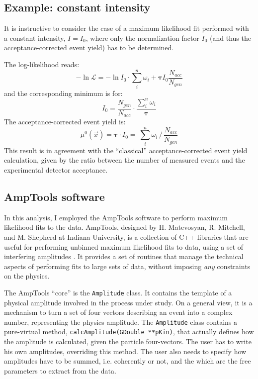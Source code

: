 \documentclass[a4paper,10pt]{report}
\begin{document}
\subsection{Example: constant intensity}

It is instructive to consider the case of a maximum likelihood fit performed with a constant intensity, $I=I_0$, where only the normalization factor $I_0$ (and thus the acceptance-corrected event yield) has to be determined.

The log-likelihood reads:
\begin{equation}
-\ln{\mathcal L} =- \ln{I_0} \cdot \sum_i^n \omega_i + \boldsymbol{\tau} I_0\frac{N_{acc}}{N_{gen}}
\end{equation}
and the corresponding minimum is for:
\begin{equation}
I_0 = \frac{N_{gen}}{N_{acc}} \cdot \frac{\sum_i^n \omega_i}{\boldsymbol{\tau}}
\end{equation} 
The acceptance-corrected event yield is:
\begin{equation}
\mu^0(\vec{x}) = \boldsymbol{\tau} \cdot I_0 = \ \sum_i^n \omega_i  \, / \, \frac{N_{acc}}{N_{gen}}
\end{equation} 
This result is in agreement with the ``classical'' acceptance-corrected event yield calculation, given by the ratio between the number of measured events and the experimental detector acceptance.

\subsection{AmpTools software}
In this analysis, I employed the AmpTools software to perform maximum likelihood fits to the data.
AmpTools, designed by H. Matevosyan, R. Mitchell, and M. Shepherd at Indiana University, 
is a collection of C++ libraries that are useful for performing unbinned maximum likelihood fits to data, 
using a set of interfering amplitudes \cite{AmpTools}. 
It provides a set of routines that manage the technical aspects of performing fits to large sets of data, without imposing \textit{any} constraints on the physics.

The AmpTools ``core'' is the \texttt{Amplitude} class. 
It contains the template of a physical amplitude involved in the process under study.
 On a general view, it is a mechanism to turn a set of four vectors describing an event into a complex number, representing the physics amplitude. 
The \texttt{Amplitude} class contains a pure-virtual method, \texttt{calcAmplitude(GDouble~**pKin)}, 
that actually defines how the amplitude is calculated, given the particle four-vectors.
The user has to write his own amplitudes, overriding this method. 
The user also needs to specify how amplitudes have to be summed, i.e. coherently or not, and the which are the free parameters to extract from the data.
\end{document}
